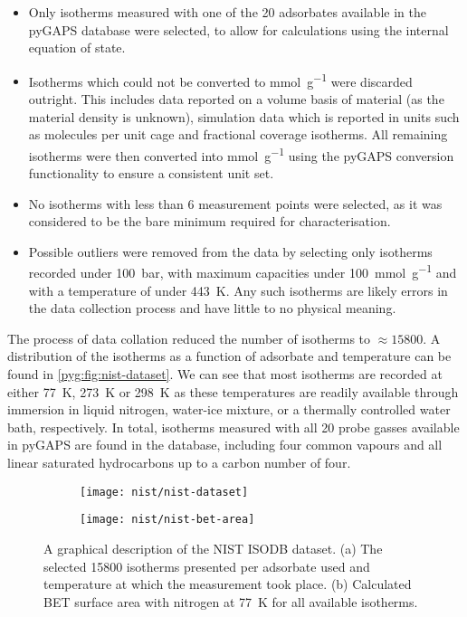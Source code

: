\begin{itemize}
	\item Only isotherms measured with one of the 20 adsorbates available
	      in the pyGAPS database were selected, to allow for calculations
	      using the internal equation of state.
	\item Isotherms which could not be converted to \si{\milli\mol\per\gram}
	      were discarded outright. This includes data reported
	      on a volume basis of material (as the material density is
	      unknown), simulation data which is reported in units such
	      as molecules per unit cage and fractional coverage isotherms.
	      All remaining isotherms were then converted into
	      \si{\milli\mol\per\gram} using the pyGAPS conversion
	      functionality to ensure a consistent unit set.
	\item No isotherms with less than 6 measurement points were
	      selected, as it was considered to be the bare
	      minimum required for characterisation.
	\item Possible outliers were removed from the data by selecting
	      only isotherms recorded under \SI{100}{\bar}, with maximum capacities
	      under \SI{100}{\milli\mol\per\gram} and with a temperature of under
	      \SI{443}{\kelvin}. Any such isotherms are likely errors in the
	      data collection process and have little to no physical meaning.
\end{itemize}

The process of data collation reduced the number of isotherms
to \(\approx \! 15800\). A distribution of the isotherms as a
function of adsorbate and temperature can be found
in \autoref{pyg:fig:nist-dataset}.
We can see that most isotherms are recorded at either
\SI{77}{\kelvin}, \SI{273}{\kelvin} or \SI{298}{\kelvin} as
these temperatures are readily available through immersion
in liquid nitrogen, water-ice mixture, or a thermally controlled
water bath, respectively. In total, isotherms measured with all 20
probe gasses available in pyGAPS are found in the database,
including four common vapours and all linear saturated hydrocarbons
up to a carbon number of four.

\begin{figure}[htb]
	\centering

	\begin{subfigure}[b]{0.5\linewidth}
		\texttt{[image: nist/nist-dataset]}%
		\caption{}%
		\label{pyg:fig:nist-dataset}
	\end{subfigure}%
	\begin{subfigure}[b]{0.45\linewidth}
		\texttt{[image: nist/nist-bet-area]}%
		\caption{}%
		\label{pyg:fig:nist-dataset-area}
	\end{subfigure}%

	\caption{A graphical description of the NIST ISODB dataset.
		(a) The selected 15800 isotherms presented per adsorbate used
		and temperature at which the measurement took place.
		(b) Calculated \gls{BET} surface area with nitrogen at \SI{77}{\kelvin}
		for all available isotherms. }%
	\label{pyg:fig:nist-set}
\end{figure}

